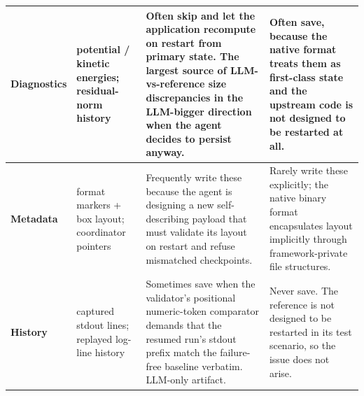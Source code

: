 \documentclass[conference]{IEEEtran}
\begin{document}
\begin{table}[t]
\begin{tabular}{@{}p{2.0cm}p{4.2cm}p{4.6cm}p{4.6cm}@{}}
\midrule
\textbf{Diagnostics}     & potential / kinetic energies; residual-norm history & Often skip and let the application recompute on restart from primary state. The largest source of LLM-vs-reference size discrepancies in the LLM-bigger direction when the agent decides to persist anyway. & Often save, because the native format treats them as first-class state and the upstream code is not designed to be restarted at all. \\
\midrule
\textbf{Metadata}        & format markers + box layout; coordinator pointers   & Frequently write these because the agent is designing a new self-describing payload that must validate its layout on restart and refuse mismatched checkpoints.                                               & Rarely write these explicitly; the native binary format encapsulates layout implicitly through framework-private file structures. \\
\midrule
\textbf{History}         & captured stdout lines; replayed log-line history    & Sometimes save when the validator's positional numeric-token comparator demands that the resumed run's stdout prefix match the failure-free baseline verbatim. LLM-only artifact.                             & Never save. The reference is not designed to be restarted in its test scenario, so the issue does not arise.            \\
\bottomrule
\end{tabular}
\end{table}
\end{document}
